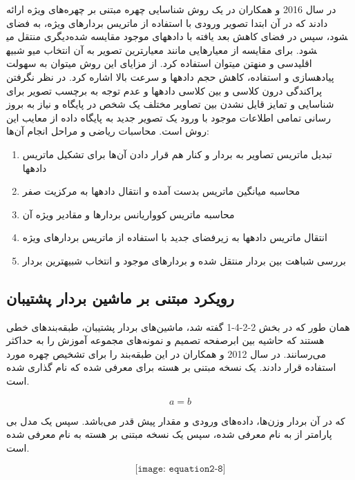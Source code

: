 \noindent
در سال 2016  و همکاران در \cite{7854053} یک روش شناسایی چهره مبتنی بر چهره‌های ویژه ارائه دادند که در آن ابتدا تصویر ورودی با استفاده از ماتریس بردارهای ویژه، به فضای دیگری منتقل می‎شود، سپس در فضای کاهش بعد یافته با داده‏های موجود مقایسه شده و شبیه‎ترین تصویر به آن انتخاب می‎شود. برای مقایسه از معیارهایی مانند معیار اقلیدسی و منهتن می‏توان استفاده کرد. از مزایای این روش می‏توان به سهولت پیاده‏سازی و استفاده، کاهش حجم داده‏ها و سرعت بالا اشاره کرد. در نظر نگرفتن پراکندگی درون کلاسی و بین کلاسی داده‏ها و عدم توجه به برچسب تصویر برای شناسایی و تمایز قایل نشدن بین تصاویر مختلف یک شخص در پایگاه و نیاز به بروز رسانی تمامی اطلاعات موجود با ورود یک تصویر جدید به پایگاه داده از معایب این روش است. 
محاسبات ریاضی و مراحل انجام آن‌ها:
\begin{enumerate}
\item
	تبدیل ماتریس تصاویر به بردار و کنار هم قرار دادن آن‌ها برای تشکیل ماتریس داده‏ها
\item 
	محاسبه‏ میانگین ماتریس بدست آمده و انتقال داده‏ها به مرکزیت صفر
\item
محاسبه‏ ماتریس کوواریانس بردارها و مقادیر ویژه‏ آن
\item
انتقال ماتریس داده‏ها به زیرفضای جدید با استفاده از ماتریس بردارهای ویژه
\item
	بررسی شباهت بین بردار منتقل شده و بردارهای موجود و انتخاب شبیه‏ترین بردار
\end{enumerate}

\subsection{رویکرد مبتنی بر ماشین بردار پشتیبان}
همان طور که در بخش 2-2-4-1 گفته شد، ماشین‌های بردار پشتیبان، طبقه‌بندهای خطی هستند که حاشیه بین ابرصفحه تصمیم و نمونه‌های مجموعه آموزش را به حداکثر می‌رسانند. در سال 2012  و همکاران در \cite{KHAN201266} این طبقه‌بند را برای تشخیص چهره مورد استفاده قرار دادند. یک نسخه مبتنی بر هسته برای  معرفی شده که  نام گذاری شده است.

\begin{equation}\label{eq2-7}
a = b
\end{equation}

\noindent	
که در آن  بردار وزن‌ها،  داده‌های ورودی و  مقدار پیش قدر می‌باشد. سپس یک مدل بی پارامتر از  به نام  معرفی شده، سپس یک نسخه مبتنی بر هسته  به نام  معرفی شده است. 

\begin{equation}\label{eq2-8}
\texttt{[image: equation2-8]}
\end{equation}

